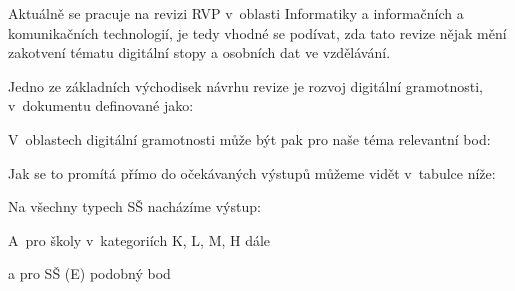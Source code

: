 Aktuálně se pracuje na revizi RVP v~oblasti Informatiky a informačních a komunikačních technologií, je tedy vhodné se podívat, zda tato revize nějak mění zakotvení tématu digitální stopy a osobních dat ve vzdělávání.

Jedno ze základních východisek návrhu revize je rozvoj digitální gramotnosti, v~dokumentu definované jako:

\begin{displayquote}
	\citep{revize}
\end{displayquote}

V~oblastech digitální gramotnosti může být pak pro naše téma relevantní bod:

\begin{displayquote}
	\citep{revize}
\end{displayquote}

Jak se to promítá přímo do očekávaných výstupů můžeme vidět v~tabulce níže:


Na všechny typech SŠ nacházíme výstup:

\begin{displayquote}
	\citep{revize}
\end{displayquote}

A~pro školy v~kategoriích K, L, M, H dále

\begin{displayquote}
	\citep{revize}
\end{displayquote}

a pro SŠ (E) podobný bod

\begin{displayquote}
	\citep{revize}
\end{displayquote}

